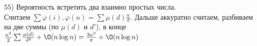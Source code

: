 ﻿55) Вероятность встретить два взаимно простых числа.\\
Считаем $\sum \varphi(i), \varphi(n)=\sum \mu(d)\frac{n}{d}$. Дальше аккуратно считаем, разбиваем на две суммы (по $\mu(d)$ и $d'$), в конце $\frac{n^2}{2}\sum\frac{\mu(d)}{d^2}+\O(n\log n)=\frac{3n^2}{\pi}+\O(n\log n)$\\
